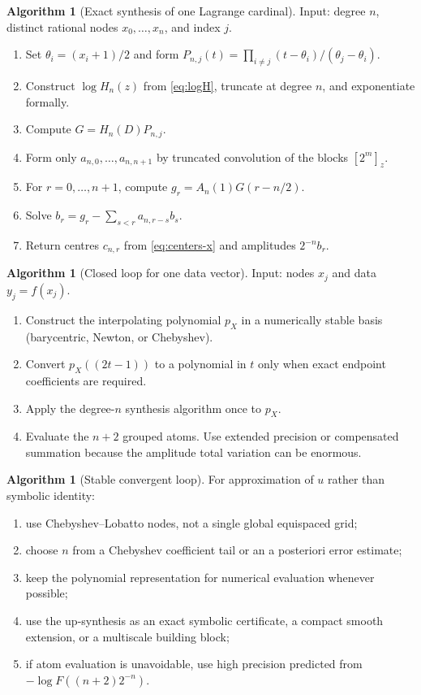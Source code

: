 \documentclass[11pt,oneside]{article}
\theoremstyle{definition}
\newtheorem{algorithm}[theorem]{Algorithm}
\theoremstyle{remark}
\newcommand{\1}{\mathbf{1}}
\begin{document}
\begin{algorithm}[Exact synthesis of one Lagrange cardinal]
\label{alg:cardinal}
Input: degree $n$, distinct rational nodes $x_0,\ldots,x_n$, and index $j$.

\begin{enumerate}[label=\arabic*.]
\item Set $\theta_i=(x_i+1)/2$ and form
$P_{n,j}(t)=\prod_{i\ne j}(t-\theta_i)/(\theta_j-\theta_i)$.
\item Construct $\log H_n(z)$ from \eqref{eq:logH}, truncate at degree $n$,
and exponentiate formally.
\item Compute $G=H_n(D)P_{n,j}$.
\item Form only $a_{n,0},\ldots,a_{n,n+1}$ by truncated convolution of the
blocks $[2^m]_z$.
\item For $r=0,\ldots,n+1$, compute
$g_r=A_n(1)G(r-n/2)$.
\item Solve
$b_r=g_r-\sum_{s<r}a_{n,r-s}b_s$.
\item Return centres $c_{n,r}$ from \eqref{eq:centers-x} and amplitudes
$2^{-n}b_r$.
\end{enumerate}
\end{algorithm}

\begin{algorithm}[Closed loop for one data vector]
\label{alg:loop}
Input: nodes $x_j$ and data $y_j=f(x_j)$.

\begin{enumerate}[label=\arabic*.]
\item Construct the interpolating polynomial $p_X$ in a numerically stable
basis (barycentric, Newton, or Chebyshev).
\item Convert $p_X((2t-1))$ to a polynomial in $t$ only when exact endpoint
coefficients are required.
\item Apply the degree-$n$ synthesis algorithm once to $p_X$.
\item Evaluate the $n+2$ grouped atoms.  Use extended precision or compensated
summation because the amplitude total variation can be enormous.
\end{enumerate}
\end{algorithm}

\begin{algorithm}[Stable convergent loop]
\label{alg:stable}
For approximation of $u$ rather than symbolic identity:

\begin{enumerate}[label=\arabic*.]
\item use Chebyshev--Lobatto nodes, not a single global equispaced grid;
\item choose $n$ from a Chebyshev coefficient tail or an a posteriori error
estimate;
\item keep the polynomial representation for numerical evaluation whenever
possible;
\item use the up-synthesis as an exact symbolic certificate, a compact smooth
extension, or a multiscale building block;
\item if atom evaluation is unavoidable, use high precision predicted from
$-\log F((n+2)2^{-n})$.
\end{enumerate}
\end{algorithm}
\end{document}
